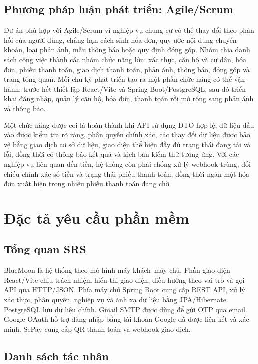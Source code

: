 ﻿\documentclass[12pt,a4paper]{report}
\newcommand{\projectname}{BlueMoon}
\begin{document}
\section{Phương pháp luận phát triển: Agile/Scrum}
Dự án phù hợp với Agile/Scrum vì nghiệp vụ chung cư có thể thay đổi theo phản hồi của người dùng, chẳng hạn cách sinh hóa đơn, quy ước nội dung chuyển khoản, loại phản ánh, mẫu thông báo hoặc quy định đóng góp. Nhóm chia danh sách công việc thành các nhóm chức năng lớn: xác thực, căn hộ và cư dân, hóa đơn, phiếu thanh toán, giao dịch thanh toán, phản ánh, thông báo, đóng góp và trang tổng quan. Mỗi chu kỳ phát triển tạo ra một phần chức năng có thể vận hành: trước hết thiết lập React/Vite và Spring Boot/PostgreSQL, sau đó triển khai đăng nhập, quản lý căn hộ, hóa đơn, thanh toán rồi mở rộng sang phản ánh và thông báo.

Một chức năng được coi là hoàn thành khi API sử dụng DTO hợp lệ, dữ liệu đầu vào được kiểm tra rõ ràng, phân quyền chính xác, các thay đổi dữ liệu được bảo vệ bằng giao dịch cơ sở dữ liệu, giao diện thể hiện đầy đủ trạng thái đang tải và lỗi, đồng thời có thông báo kết quả và kịch bản kiểm thử tương ứng. Với các nghiệp vụ liên quan đến tiền, hệ thống còn phải chống xử lý webhook trùng, đối chiếu chính xác số tiền và trạng thái phiếu thanh toán, đồng thời ngăn một hóa đơn xuất hiện trong nhiều phiếu thanh toán đang chờ.

\chapter{Đặc tả yêu cầu phần mềm}

\section{Tổng quan SRS}
\projectname{} là hệ thống theo mô hình máy khách--máy chủ. Phần giao diện React/Vite chịu trách nhiệm hiển thị giao diện, điều hướng theo vai trò và gọi API qua HTTP/JSON. Phía máy chủ Spring Boot cung cấp REST API, xử lý xác thực, phân quyền, nghiệp vụ và ánh xạ dữ liệu bằng JPA/Hibernate. PostgreSQL lưu dữ liệu chính. Gmail SMTP được dùng để gửi OTP qua email. Google OAuth hỗ trợ đăng nhập bằng tài khoản Google đã được liên kết và xác minh. SePay cung cấp QR thanh toán và webhook giao dịch.

\section{Danh sách tác nhân}
\end{document}
